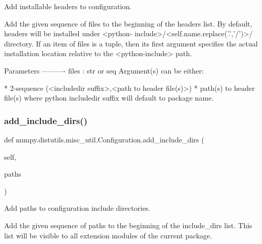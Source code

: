 \begin{DoxyVerb}Add installable headers to configuration.

Add the given sequence of files to the beginning of the headers list.
By default, headers will be installed under <python-
include>/<self.name.replace('.','/')>/ directory. If an item of files
is a tuple, then its first argument specifies the actual installation
location relative to the <python-include> path.

Parameters
----------
files : str or seq
    Argument(s) can be either:

* 2-sequence (<includedir suffix>,<path to header file(s)>)
* path(s) to header file(s) where python includedir suffix will
  default to package name.
\end{DoxyVerb}
 \mbox{\label{classnumpy_1_1distutils_1_1misc__util_1_1Configuration_a2cf3fffe79288c8bd03972547ba434b5}} 
\subsubsection{\texorpdfstring{add\+\_\+include\+\_\+dirs()}{add\_include\_dirs()}}
{\footnotesize\ttfamily def numpy.\+distutils.\+misc\+\_\+util.\+Configuration.\+add\+\_\+include\+\_\+dirs (\begin{DoxyParamCaption}\item[{}]{self,  }\item[{}]{paths }\end{DoxyParamCaption})}

\begin{DoxyVerb}Add paths to configuration include directories.

Add the given sequence of paths to the beginning of the include_dirs
list. This list will be visible to all extension modules of the
current package.
\end{DoxyVerb}
 \mbox{\label{classnumpy_1_1distutils_1_1misc__util_1_1Configuration_abe0ae35db2563114c814563b4e2224ff}} 
